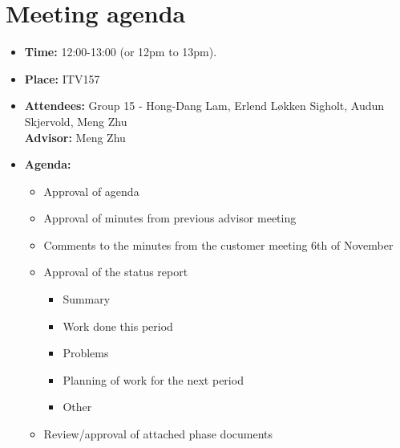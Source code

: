\documentclass[12pt, a4paper]{article}
\begin{document}
\section{Meeting agenda}
\begin{itemize}
\item \textbf{Time:} 12:00-13:00 (or 12pm to 13pm).
\item \textbf{Place:} ITV157\\
\item \textbf{Attendees:} Group 15 - Hong-Dang Lam, Erlend Løkken Sigholt, Audun
Skjervold, Meng Zhu \\ \textbf{Advisor:} Meng Zhu
\item \textbf{Agenda:} 
	\begin{itemize}
	\item Approval of agenda
	\item Approval of minutes from previous advisor meeting
	\item Comments to the minutes from the customer meeting 6th of November
	\item Approval of the status report
		\begin{itemize}
		\item Summary
		\item Work done this period
		\item Problems
		\item Planning of work for the next period
		\item Other
	\end{itemize}
	\item Review/approval of attached phase documents
	\end{itemize}
\end{itemize}
\end{document}
